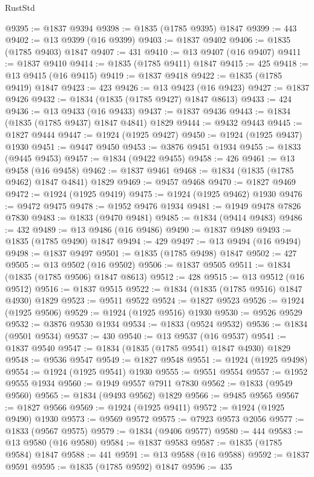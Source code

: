 \begin{lexlean}{RustStd}
\begin{coremodule}
{\begin{coremodule}
{{{{{@9395 := @1837 @9394
@9398 := @1835 (@1785 @9395) @1847
@9399 := 443
@9402 := @13 @9399 (@16 @9399)
@9403 := @1837 @9402
@9406 := @1835 (@1785 @9403) @1847
@9407 := 431
@9410 := @13 @9407 (@16 @9407)
@9411 := @1837 @9410
@9414 := @1835 (@1785 @9411) @1847
@9415 := 425
@9418 := @13 @9415 (@16 @9415)
@9419 := @1837 @9418
@9422 := @1835 (@1785 @9419) @1847
@9423 := 423
@9426 := @13 @9423 (@16 @9423)
@9427 := @1837 @9426
@9432 := @1834 (@1835 (@1785 @9427) @1847 @8613)
@9433 := 424
@9436 := @13 @9433 (@16 @9433)
@9437 := @1837 @9436
@9443 := @1834 (@1835 (@1785 @9437) @1847 @4841) @1829
@9444 := @9432 @9443
@9445 := @1827 @9444
@9447 := @1924 (@1925 @9427)
@9450 := @1924 (@1925 @9437) @1930
@9451 := @9447 @9450
@9453 := @3876 @9451 @1934
@9455 := @1833 (@9445 @9453)
@9457 := @1834 (@9422 @9455)
@9458 := 426
@9461 := @13 @9458 (@16 @9458)
@9462 := @1837 @9461
@9468 := @1834 (@1835 (@1785 @9462) @1847 @4841) @1829
@9469 := @9457 @9468
@9470 := @1827 @9469
@9472 := @1924 (@1925 @9419)
@9475 := @1924 (@1925 @9462) @1930
@9476 := @9472 @9475
@9478 := @1952 @9476 @1934
@9481 := @1949 @9478 @7826 @7830
@9483 := @1833 (@9470 @9481)
@9485 := @1834 (@9414 @9483)
@9486 := 432
@9489 := @13 @9486 (@16 @9486)
@9490 := @1837 @9489
@9493 := @1835 (@1785 @9490) @1847
@9494 := 429
@9497 := @13 @9494 (@16 @9494)
@9498 := @1837 @9497
@9501 := @1835 (@1785 @9498) @1847
@9502 := 427
@9505 := @13 @9502 (@16 @9502)
@9506 := @1837 @9505
@9511 := @1834 (@1835 (@1785 @9506) @1847 @8613)
@9512 := 428
@9515 := @13 @9512 (@16 @9512)
@9516 := @1837 @9515
@9522 := @1834 (@1835 (@1785 @9516) @1847 @4930) @1829
@9523 := @9511 @9522
@9524 := @1827 @9523
@9526 := @1924 (@1925 @9506)
@9529 := @1924 (@1925 @9516) @1930
@9530 := @9526 @9529
@9532 := @3876 @9530 @1934
@9534 := @1833 (@9524 @9532)
@9536 := @1834 (@9501 @9534)
@9537 := 430
@9540 := @13 @9537 (@16 @9537)
@9541 := @1837 @9540
@9547 := @1834 (@1835 (@1785 @9541) @1847 @4930) @1829
@9548 := @9536 @9547
@9549 := @1827 @9548
@9551 := @1924 (@1925 @9498)
@9554 := @1924 (@1925 @9541) @1930
@9555 := @9551 @9554
@9557 := @1952 @9555 @1934
@9560 := @1949 @9557 @7911 @7830
@9562 := @1833 (@9549 @9560)
@9565 := @1834 (@9493 @9562) @1829
@9566 := @9485 @9565
@9567 := @1827 @9566
@9569 := @1924 (@1925 @9411)
@9572 := @1924 (@1925 @9490) @1930
@9573 := @9569 @9572
@9575 := @7923 @9573 @2056
@9577 := @1833 (@9567 @9575)
@9579 := @1834 (@9406 @9577)
@9580 := 444
@9583 := @13 @9580 (@16 @9580)
@9584 := @1837 @9583
@9587 := @1835 (@1785 @9584) @1847
@9588 := 441
@9591 := @13 @9588 (@16 @9588)
@9592 := @1837 @9591
@9595 := @1835 (@1785 @9592) @1847
@9596 := 435
}}}}}
\end{coremodule}}
\end{coremodule}
\end{lexlean}
